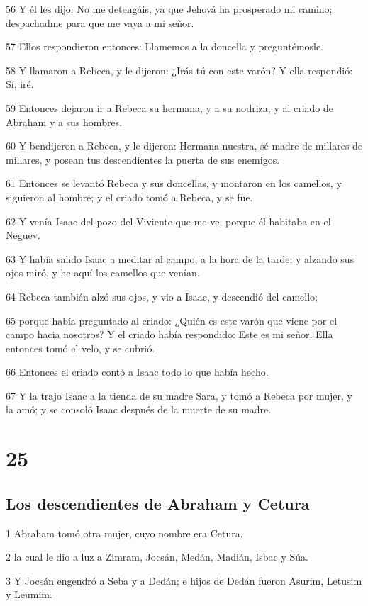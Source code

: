 56 Y él les dijo: No me detengáis, ya que Jehová ha prosperado mi camino; despachadme para que me vaya a mi señor.

57 Ellos respondieron entonces: Llamemos a la doncella y preguntémosle.

58 Y llamaron a Rebeca, y le dijeron: ¿Irás tú con este varón? Y ella respondió: Sí, iré.

59 Entonces dejaron ir a Rebeca su hermana, y a su nodriza, y al criado de Abraham y a sus hombres.

60 Y bendijeron a Rebeca, y le dijeron: Hermana nuestra, sé madre de millares de millares, y posean tus descendientes la puerta de sus enemigos.

61 Entonces se levantó Rebeca y sus doncellas, y montaron en los camellos, y siguieron al hombre; y el criado tomó a Rebeca, y se fue.

62 Y venía Isaac del pozo del Viviente-que-me-ve; porque él habitaba en el Neguev.

63 Y había salido Isaac a meditar al campo, a la hora de la tarde; y alzando sus ojos miró, y he aquí los camellos que venían.

64 Rebeca también alzó sus ojos, y vio a Isaac, y descendió del camello;

65 porque había preguntado al criado: ¿Quién es este varón que viene por el campo hacia nosotros? Y el criado había respondido: Este es mi señor. Ella entonces tomó el velo, y se cubrió.

66 Entonces el criado contó a Isaac todo lo que había hecho.

67 Y la trajo Isaac a la tienda de su madre Sara, y tomó a Rebeca por mujer, y la amó; y se consoló Isaac después de la muerte de su madre.

\chapter{25}

\section{Los descendientes de Abraham y Cetura}

1 Abraham tomó otra mujer, cuyo nombre era Cetura,

2 la cual le dio a luz a Zimram, Jocsán, Medán, Madián, Isbac y Súa.

3 Y Jocsán engendró a Seba y a Dedán; e hijos de Dedán fueron Asurim, Letusim y Leumim.

